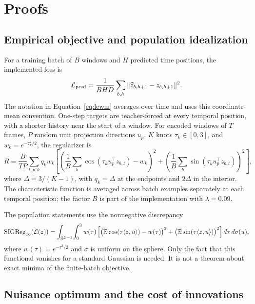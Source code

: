 \section{Proofs}
\label{app:proofs}

\subsection{Empirical objective and population idealization}
For a training batch of $B$ windows and $H$ predicted time positions, the implemented loss is
\begin{equation}
\mathcal{L}_{\mathrm{pred}}=\frac{1}{BHD}\sum_{b,h}\|\widehat z_{b,h+1}-z_{b,h+1}\|^2.
\end{equation}
The notation in Equation~\ref{eq:lewm} averages over time and uses this coordinate-mean convention.
One-step targets are teacher-forced at every temporal position, with a shorter history near the
start of a window. For encoded windows of $T$ frames, $P$ random unit projection directions $u_p$,
$K$ knots $\tau_k\in[0,3]$, and $w_k=e^{-\tau_k^2/2}$, the regularizer is
\begin{equation}
\label{eq:sigreg}
R=\frac{B}{TP}\sum_{t,p,k}q_k w_k
\left[\left(\frac1B\sum_b\cos(\tau_k u_p^\top z_{b,t})-w_k\right)^2
+\left(\frac1B\sum_b\sin(\tau_k u_p^\top z_{b,t})\right)^2\right],
\end{equation}
where $\Delta=3/(K-1)$, with $q_k=\Delta$ at the endpoints and $2\Delta$ in the interior.
The characteristic function is averaged across batch examples separately at each temporal position;
the factor $B$ is part of the implementation with $\lambda=0.09$.

The population statements use the nonnegative discrepancy
\begin{equation}
\label{eq:popsigreg}
\mathrm{SIGReg}_\infty(\mathcal L(z))=
\int_{\mathbb S^{D-1}}\!\int_0^3 w(\tau)
\left[\big(\mathbb{E}\cos(\tau\langle z,u\rangle)-w(\tau)\big)^2
+\big(\mathbb{E}\sin(\tau\langle z,u\rangle)\big)^2\right]d\tau\,d\sigma(u),
\end{equation}
where $w(\tau)=e^{-\tau^2/2}$ and $\sigma$ is uniform on the sphere.
Only the fact that this functional vanishes for a standard Gaussian is needed. It is not a theorem
about exact minima of the finite-batch objective.

\subsection{Nuisance optimum and the cost of innovations}
